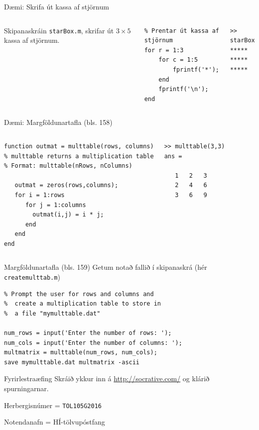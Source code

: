 \documentclass{beamer}
\begin{document}
\begin{frame}[fragile]{Dæmi: Skrifa út kassa af stjörnum}
\begin{columns}
Skipanaskráin \texttt{starBox.m}, skrifar út $3 \times 5$ kassa af stjörnum.
\begin{verbatim}
% Prentar út kassa af stjörnum
for r = 1:3
    for c = 1:5
        fprintf('*');
    end
    fprintf('\n');
end
\end{verbatim}
\begin{verbatim}
>> starBox
*****
*****
*****
\end{verbatim}
\end{columns}
\end{frame}

\begin{frame}[fragile]{Dæmi: Margföldunartafla (bls. 158)}
\begin{columns}
\begin{verbatim}
function outmat = multtable(rows, columns)
% multtable returns a multiplication table
% Format: multtable(nRows, nColumns)

   outmat = zeros(rows,columns);
   for i = 1:rows
      for j = 1:columns
        outmat(i,j) = i * j;
      end
   end
end
\end{verbatim}
\begin{verbatim}
>> multtable(3,3)
ans =

   1   2   3
   2   4   6
   3   6   9
\end{verbatim}
\end{columns}
\end{frame}

\begin{frame}[fragile]{Margföldunartafla (bls. 159)}
\vspace{\baselineskip}
Getum notað fallið í skipanaskrá (hér \texttt{createmulttab.m})
\begin{verbatim}
% Prompt the user for rows and columns and
%  create a multiplication table to store in
%  a file "mymulttable.dat"
 
num_rows = input('Enter the number of rows: ');
num_cols = input('Enter the number of columns: ');
multmatrix = multtable(num_rows, num_cols);
save mymulttable.dat multmatrix -ascii
\end{verbatim}
\end{frame}

\begin{frame}[fragile]{Fyrirlestraæfing}
Skráið ykkur inn á \url{http://socrative.com/} og klárið spurningarnar.

Herbergisnúmer = \texttt{TOL105G2016}

Notendanafn = HÍ-tölvupóstfang
\end{frame}
\end{document}
